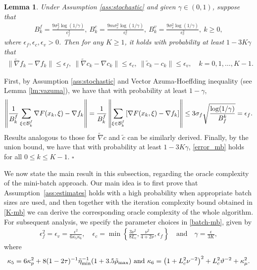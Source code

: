 \documentclass[11pt]{article}
\newenvironment{proof}{{\noindent\it Proof.}\quad}{\hfill $\square$\par}
\newcommand{\be}{\begin{equation}}
\newcommand{\ee}{\end{equation}}
\newtheorem{lemma}{Lemma}
\begin{document}
\begin{lemma}\label{lem:gradient_estimator_polyak_lemma}
Under Assumption \ref{ass:stochastic} and  given \(\gamma \in (0,1)\), suppose that %
\begin{align}\label{batch-mb}
    B_k^f =  \frac{9\sigma_f^2\log(1 /\gamma)}{\epsilon_f^2},~ B_k^c =  \frac{{9m\sigma_c^2\log(1 /\gamma)}}{\epsilon_c^2},~ B_k^v =  \frac{9\sigma_v^2\log(1 /\gamma)}{\epsilon_v^2},~  k \ge 0,
\end{align}
where $\epsilon_f,\epsilon_c,\epsilon_v>0$. Then for any $K\ge1$, it holds with probability at least {$1-3K\gamma$} that 
\be\begin{aligned}\label{error_mb}
        \|\tilde \nabla f_k - \nabla f_k\| \leq \epsilon_f,~
        \|\tilde \nabla c_k - \nabla c_k\| \leq \epsilon_c,~\|\tilde c_k - c_k\| \leq \epsilon_v, \quad k=0,1,\ldots,K-1.
    \end{aligned}\ee
\end{lemma}
\begin{proof}
    First, by Assumption \ref{ass:stochastic} and Vector Azuma-Hoeffding inequality (see Lemma \ref{lm:vazuma}), we have that with probability at least $1-\gamma$, 
\begin{align}
    \left\|\frac{1}{B_k^f} \sum_{\xi \in \mathcal B_k^f} \nabla F(x_k,\xi) - \nabla f_k\right\|  
     = \frac{1}{B_k^f}\left\|\sum_{\xi \in \mathcal B_k^f} \left[\nabla F(x_k,\xi) - \nabla f_k\right]\right\| \leq 3\sigma_f\sqrt{\frac{\log(1/\gamma)}{B^k_f}}=\epsilon_f .\notag
\end{align}
Results analogous to those for $\tilde{\nabla} c$ and $\tilde{c}$ can be similarly derived. Finally, by the union bound, we have that with probability at least {$1-3K\gamma$}, \eqref{error_mb} holds for all $0\leq k \leq K-1$.
\end{proof}

We now state the main result in this subsection, regarding the oracle complexity of the mini-batch approach. Our main idea is to first  prove that Assumption~\ref{ass:estimates} holds with a high probability when appropriate batch sizes are  used, and then together with the iteration complexity bound  obtained in \eqref{K-mb} we can derive the corresponding oracle complexity of the whole algorithm. For subsequent analysis,  we  specify the parameter choices in \eqref{batch-mb}, given by
\begin{align}\label{varepsilon}
\epsilon_f^2 = \epsilon_v = \frac{\epsilon^2}{6\kappa_5\kappa_{6}}, \quad \epsilon_c = \min \left\{ \frac{3\nu^2}{8L_c}, \frac{\nu^2}{4+2\nu}, \epsilon_f \right\} \quad \text{and} \quad {\gamma = \frac{\epsilon}{3K}},
\end{align}
where
\begin{align}\label{kappa56}
    \kappa_5 = 6\kappa_p^2 + 8(1-2\tau)^{-1}\tilde \eta_{\rm min}^{-1}(1+3.5\tilde \rho_{\max}) ~{\rm and}~ \kappa_6 = \left(1+L_c^2\nu^{-2}\right)^2+ L_c^2\vartheta^{-2}+\kappa_\mu^2.
\end{align}
\end{document}
